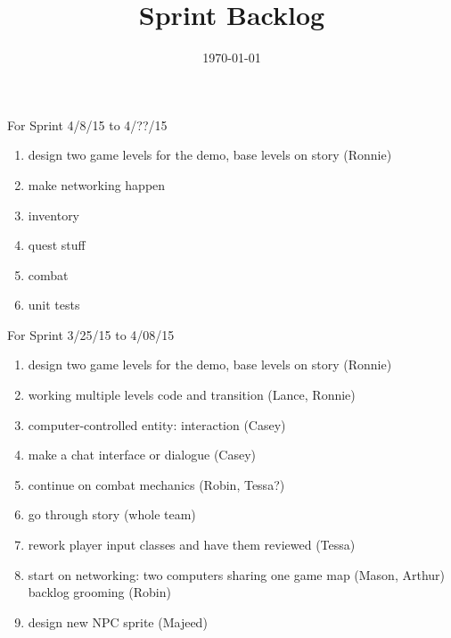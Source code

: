 \documentclass[12pt]{article}
\title{Sprint Backlog}
\date{\today}
\begin{document}
\maketitle



\begin{section}{For Sprint 4/8/15 to 4/??/15}
\begin{enumerate}

\item design two game levels for the demo, base levels on story (Ronnie)

\item make networking happen
\item inventory
\item quest stuff
\item combat
\item unit tests

\end{enumerate}
\end{section}



\begin{section}{For Sprint 3/25/15 to 4/08/15}
\begin{enumerate}
\item design two game levels for the demo, base levels on story (Ronnie)
\item working multiple levels code and transition (Lance, Ronnie)
\item computer-controlled entity: interaction (Casey)
\item make a chat interface or dialogue (Casey)
\item continue on combat mechanics (Robin, Tessa?)
\item go through story (whole team)
\item rework player input classes and have them reviewed (Tessa) 
\item start on networking: two computers sharing one game map (Mason, Arthur)
\itm backlog grooming (Robin)
\item design new NPC sprite (Majeed)
\end{enumerate}
\end{section}
\end{document}
